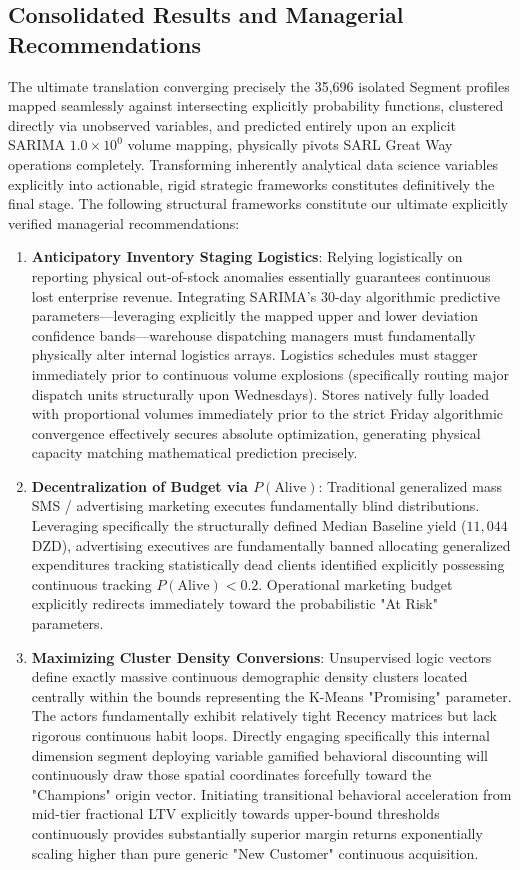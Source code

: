 \documentclass[12pt,a4paper]{report}
\begin{document}
\subsection{Consolidated Results and Managerial Recommendations}
The ultimate translation converging precisely the 35,696 isolated Segment profiles mapped seamlessly against intersecting explicitly probability functions, clustered directly via unobserved variables, and predicted entirely upon an explicit SARIMA $1.0\times10^0$ volume mapping, physically pivots SARL Great Way operations completely. Transforming inherently analytical data science variables explicitly into actionable, rigid strategic frameworks constitutes definitively the final stage. The following structural frameworks constitute our ultimate explicitly verified managerial recommendations:

\begin{enumerate}
    \item \textbf{Anticipatory Inventory Staging Logistics}: Relying logistically on reporting physical out-of-stock anomalies essentially guarantees continuous lost enterprise revenue. Integrating SARIMA's 30-day algorithmic predictive parameters—leveraging explicitly the mapped upper and lower deviation confidence bands—warehouse dispatching managers must fundamentally physically alter internal logistics arrays. Logistics schedules must stagger immediately prior to continuous volume explosions (specifically routing major dispatch units structurally upon Wednesdays). Stores natively fully loaded with proportional volumes immediately prior to the strict Friday algorithmic convergence effectively secures absolute optimization, generating physical capacity matching mathematical prediction precisely.
    \item \textbf{Decentralization of Budget via $P(\text{Alive})$}: Traditional generalized mass SMS / advertising marketing executes fundamentally blind distributions. Leveraging specifically the structurally defined Median Baseline yield ($11,044$ DZD), advertising executives are fundamentally banned allocating generalized expenditures tracking statistically dead clients identified explicitly possessing continuous tracking $P(\text{Alive}) < 0.2$. Operational marketing budget explicitly redirects immediately toward the probabilistic "At Risk" parameters. 
    \item \textbf{Maximizing Cluster Density Conversions}: Unsupervised logic vectors define exactly massive continuous demographic density clusters located centrally within the bounds representing the K-Means "Promising" parameter. The actors fundamentally exhibit relatively tight Recency matrices but lack rigorous continuous habit loops. Directly engaging specifically this internal dimension segment deploying variable gamified behavioral discounting will continuously draw those spatial coordinates forcefully toward the "Champions" origin vector. Initiating transitional behavioral acceleration from mid-tier fractional LTV explicitly towards upper-bound thresholds continuously provides substantially superior margin returns exponentially scaling higher than pure generic "New Customer" continuous acquisition.
\end{enumerate}
\end{document}
